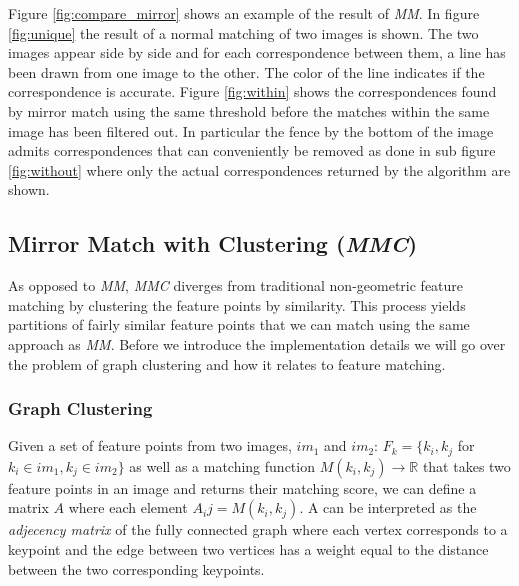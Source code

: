 \documentclass{article}
\begin{document}
Figure \ref{fig:compare_mirror} shows an example of the result of 
\emph{MM}. In figure \ref{fig:unique} the result of a normal matching of 
two images is shown. The two images appear side by side and for each 
correspondence between them, a line has been drawn from one image to the 
other. The color of the line indicates if the correspondence is 
accurate. Figure \ref{fig:within} shows the correspondences found by 
mirror match using the same threshold before the matches within the same 
image has been filtered out. In particular the fence by the bottom of 
the image admits correspondences that can conveniently be removed as 
done in sub figure \ref{fig:without} where only the actual 
correspondences returned by the algorithm are shown.

\subsection{Mirror Match with Clustering (\emph{MMC})}

As opposed to \emph{MM}, \emph{MMC} diverges from traditional 
non-geometric feature matching by clustering the feature points by 
similarity. This process yields partitions of fairly similar feature 
points that we can match using the same approach as \emph{MM}. Before we 
introduce the implementation details we will go over the problem of graph 
clustering and how it relates to feature matching.

\subsubsection{Graph Clustering}

Given a set of feature points from two images, $im_1$ and $im_2$: $F_k = 
\{k_i, k_j$ for $k_i \in im_1, k_j \in im_2\}$ as well as a matching 
function $M(k_i, k_j) \rightarrow \mathbb{R}$ that takes two feature 
points in an image and returns their matching score, we can define a 
matrix $A$ where each element $A_ij = M(k_i, k_j)$. A can be interpreted 
as the \emph{adjecency matrix} of the fully connected graph where each 
vertex corresponds to a keypoint and the edge between two vertices has a 
weight equal to the distance between the two corresponding keypoints.
\end{document}

